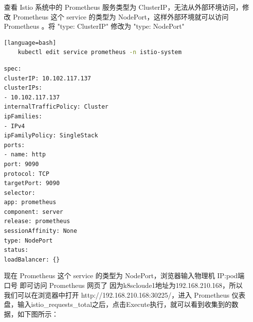 查看 Istio 系统中的 Prometheus 服务类型为 ClusterIP，无法从外部环境访问，修改 Prometheus 这个 service 的类型为 NodePort，这样外部环境就可以访问 Prometheus 。将 "type: ClusterIP" 修改为 "type: NodePort"
\begin{lstlisting}[language=bash][language=bash]
	kubectl edit service prometheus -n istio-system
\end{lstlisting}
\begin{lstlisting}[language=bash]
spec:
clusterIP: 10.102.117.137
clusterIPs:
- 10.102.117.137
internalTrafficPolicy: Cluster
ipFamilies:
- IPv4
ipFamilyPolicy: SingleStack
ports:
- name: http
port: 9090
protocol: TCP
targetPort: 9090
selector:
app: prometheus
component: server
release: prometheus
sessionAffinity: None
type: NodePort
status:
loadBalancer: {}
\end{lstlisting}
现在 Prometheus 这个 service 的类型为 NodePort，浏览器输入物理机 IP:pod端口号 即可访问 Prometheus 网页了
因为k8scloude1地址为192.168.210.168，所以我们可以在浏览器中打开 http://192.168.210.168:30225/，进入 Prometheus 仪表盘，输入istio\_requests\_total之后，点击Execute执行，就可以看到收集到的数据，如下图所示：

